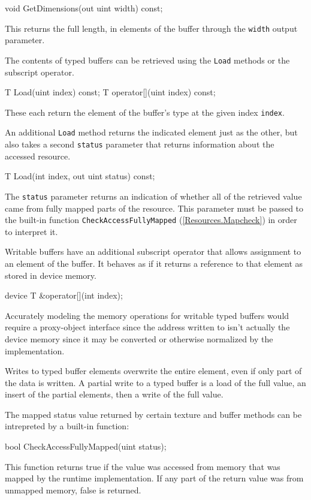 \begin{HLSL}
void GetDimensions(out uint width) const;
\end{HLSL}

\p This returns the full length, in elements of the buffer through the
\texttt{width} output parameter.


\p The contents of typed buffers can be retrieved using the \texttt{Load} methods
or the subscript operator.

\begin{HLSL}
T Load(uint index) const;
T operator[](uint index) const;
\end{HLSL}

\p These each return the element of the buffer's type at the given index
\texttt{index}.

\p An additional \texttt{Load} method returns the indicated element just as the
other, but also takes a second \texttt{status} parameter that returns
information about the accessed resource.

\begin{HLSL}
T Load(int index, out uint status) const;
\end{HLSL}

\p The \texttt{status} parameter returns an indication of whether all of the
retrieved value came from fully mapped parts of the resource. This parameter
must be passed to the built-in function \texttt{CheckAccessFullyMapped}
(\ref{Resources.Mapcheck}) in order to interpret it.

\p Writable buffers have an additional subscript operator that allows assignment
to an element of the buffer. It behaves as if it returns a reference to that
element as stored in device memory.

\begin{HLSL}
device T &operator[](int index);
\end{HLSL}

\begin{note}
  Accurately modeling the memory operations for writable typed buffers would
  require a proxy-object interface since the address written to isn't actually
  the device memory since it may be converted or otherwise normalized by the
  implementation.
\end{note}

\p Writes to typed buffer elements overwrite the entire element, even if only
part of the data is written. A partial write to a typed buffer is a load of the
full value, an insert of the partial elements, then a write of the full value.


\p The mapped status value returned by certain texture and buffer methods can be
intrepreted by a built-in function:

\begin{HLSL}
bool CheckAccessFullyMapped(uint status);
\end{HLSL}

\p This function returns true if the value was accessed from memory that was
mapped by the runtime implementation. If any part of the return value was from
unmapped memory, false is returned.
